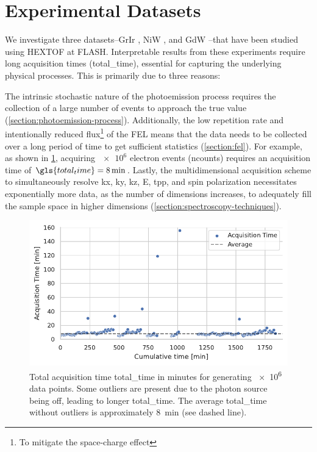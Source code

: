\section{Experimental Datasets}\label{section:datasets}
We investigate three datasets--\gls{GrIr} \cite{heberMultispectralTimeresolvedEnergy2022}, \gls{NiW} \cite{shokeenRealtimeObservationNonequilibrium2024}, and \gls{GdW} \cite{kutnyakhovMultidimensionalPhotoemissionSpectra2024}--that have been studied using \gls{HEXTOF} at \gls{FLASH}. Interpretable results from these experiments require long acquisition times (\gls{total_time}), essential for capturing the underlying physical processes. This is primarily due to three reasons:

The intrinsic stochastic nature of the photoemission process requires the collection of a large number of events to approach the true value (\cref{section:photoemission-process}). Additionally, the low repetition rate and intentionally reduced flux\footnote{To mitigate the space-charge effect} of the \gls{FEL} means that the data  needs to be collected over a long period of time to get sufficient statistics (\cref{section:fel}). For example, as shown in \cref{fig:acq-time-1M}, acquiring $\num{e6}$ electron events (\gls{ncounts})  requires an acquisition time of $\gls{total_time}=\qty{8}{\min}$. Lastly, the multidimensional acquisition scheme to simultaneously resolve \gls{kx}, \gls{ky}, \gls{kz}, \gls{E}, \gls{tpp}, and spin polarization necessitates exponentially  more data, as the number of dimensions increases, to adequately fill the sample space in higher dimensions (\cref{section:spectroscopy-techniques}).

\begin{figure}[h]
    \centering
    \includegraphics[width=0.8\linewidth]{images/acq_time_1M.pdf}
    \caption{Total acquisition time \gls{total_time} in minutes for generating \num{e6} data points. Some outliers are present due to the photon source being off, leading to longer \gls{total_time}. The average \gls{total_time} without outliers is approximately \qty{8}{min} (see dashed line).}
    \label{fig:acq-time-1M}
\end{figure}

